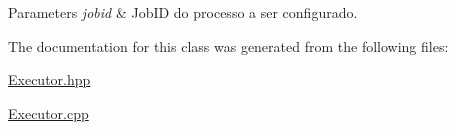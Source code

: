 \begin{DoxyParams}{Parameters}
{\em jobid} & JobID do processo a ser configurado. \\
\hline
\end{DoxyParams}


The documentation for this class was generated from the following files:\begin{DoxyCompactItemize}
\item 
\hyperlink{Executor_8hpp}{Executor.hpp}\item 
\hyperlink{Executor_8cpp}{Executor.cpp}\end{DoxyCompactItemize}
